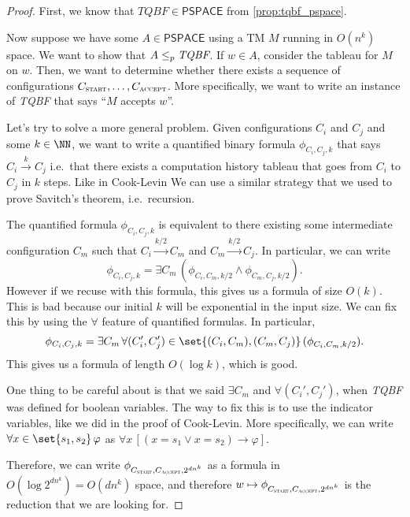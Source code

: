\documentclass{standalone}
\begin{document}
\begin{proof}
  First, we know that \(\textit{TQBF} \in \mathsf{PSPACE}\) from \cref{prop:tqbf_pspace}.
  
  Now suppose we have some \(A \in \mathsf{PSPACE}\) using a \textsf{TM} \(M\) running in \(O(n^k)\) space. We want to show that \(A \mathrel{\leq_p} \textit{TQBF}\). If \(w \in A\), consider the tableau for \(M\) on \(w\). Then, we want to determine whether there exists a sequence of configurations \(C_{\textsc{start}}, \dots, C_{\textsc{accept}}\). More specifically, we want to write an instance of \textit{TQBF} that says ``\(M\) accepts \(w\)''.

  Let's try to solve a more general problem. Given configurations \(C_i\) and \(C_j\) and some \(k \in \NN\), we want to write a quantified binary formula \(\phi_{C_i, C_j, k}\) that says \(C_i \stackrel{k}{\to} C_j\) i.e.\ that there exists a computation history tableau that goes from \(C_i\) to \(C_j\) in \(k\) steps. Like in Cook-Levin We can use a similar strategy that we used to prove Savitch's theorem, i.e.\ recursion.

  The quantified formula \(\phi_{C_i, C_j, k}\) is equivalent to there existing some intermediate configuration \(C_m\) such that \(C_i \xrightarrow{k/2} C_m\) and \(C_m \xrightarrow{k/2} C_j\). In particular, we can write
  \[
    \phi_{C_i, C_j, k} =
      \exists C_m \, (
        \phi_{C_i, C_m, k/2} \land
        \phi_{C_m, C_j, k/2}
      ).
  \]
  However if we recuse with this formula, this gives us a formula of size \(O(k)\). This is bad because our initial \(k\) will be exponential in the input size. We can fix this by using the \(\forall\) feature of quantified formulas. In particular,
  \[
    \phi_{C_i, C_j, k} =
      \exists C_m \, \forall (C_i', C_j') \in \set{(C_i, C_m), (C_m, C_j)} \, (
        \phi_{C_i, C_m, k/2}
      ).
  \]
  This gives us a formula of length \(O(\log k)\), which is good.

  One thing to be careful about is that we said \(\exists C_m\) and \(\forall(C_i', C_j')\), when \textit{TQBF} was defined for boolean variables. The way to fix this is to use the indicator variables, like we did in the proof of Cook-Levin. More specifically, we can write \(\forall x \in \set{s_1, s_2}\, \varphi\) as \(\forall x \, [(x = s_1 \lor x = s_2) \rightarrow \varphi]\).

  Therefore, we can write \(\phi_{C_{\textsc{start}}, C_{\textsc{accept}}, 2^{d n^k}}\) as a formula in \(O(\log 2^{d n^k}) = O(d n^k)\) space, and therefore \(w \mapsto \phi_{C_{\textsc{start}}, C_{\textsc{accept}}, 2^{d n^k}}\) is the reduction that we are looking for.
\end{proof}
\end{document}
